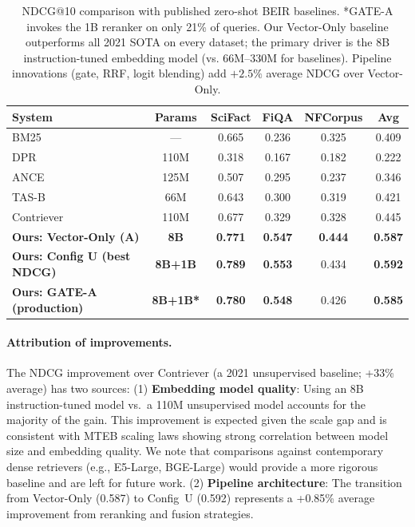 \documentclass[11pt]{article}
\begin{document}
\begin{table}[H]
\centering
\small
\begin{tabular}{lccccc}
\toprule
\textbf{System} & \textbf{Params} & \textbf{SciFact} & \textbf{FiQA} & \textbf{NFCorpus} & \textbf{Avg} \\
\midrule
BM25 \citep{thakur2021beir} & --- & 0.665 & 0.236 & 0.325 & 0.409 \\
DPR \citep{karpukhin2020dpr} & 110M & 0.318 & 0.167 & 0.182 & 0.222 \\
ANCE \citep{xiong2021ance} & 125M & 0.507 & 0.295 & 0.237 & 0.346 \\
TAS-B \citep{hofstatter2021tasb} & 66M & 0.643 & 0.300 & 0.319 & 0.421 \\
Contriever \citep{izacard2021contriever} & 110M & 0.677 & 0.329 & 0.328 & 0.445 \\
\midrule
\textbf{Ours: Vector-Only (A)} & \textbf{8B} & \textbf{0.771} & \textbf{0.547} & \textbf{0.444} & \textbf{0.587} \\
\textbf{Ours: Config U (best NDCG)} & \textbf{8B+1B} & \textbf{0.789} & \textbf{0.553} & 0.434 & \textbf{0.592} \\
\textbf{Ours: GATE-A (production)} & \textbf{8B+1B*} & \textbf{0.780} & \textbf{0.548} & 0.426 & \textbf{0.585} \\
\bottomrule
\end{tabular}
\caption{NDCG@10 comparison with published zero-shot BEIR baselines. *GATE-A invokes
the 1B reranker on only 21\% of queries. Our Vector-Only baseline outperforms all 2021
SOTA on every dataset; the primary driver is the 8B instruction-tuned embedding model
(vs. 66M--330M for baselines). Pipeline innovations (gate, RRF, logit blending) add
$+2.5\%$ average NDCG over Vector-Only.}
\label{tab:sota}
\end{table}

\paragraph{Attribution of improvements.}
The NDCG improvement over Contriever (a 2021 unsupervised baseline; +33\% average) has two sources:
(1) \textbf{Embedding model quality}: Using an 8B instruction-tuned model vs.\ a 110M
unsupervised model accounts for the majority of the gain. This improvement is expected given
the scale gap and is consistent with
MTEB \citep{muennighoff2023mteb} scaling laws showing strong correlation between model
size and embedding quality. We note that comparisons against contemporary dense retrievers
(e.g., E5-Large, BGE-Large) would provide a more rigorous baseline and are left for future work.
(2) \textbf{Pipeline architecture}: The transition from Vector-Only (0.587) to Config~U
(0.592) represents a +0.85\% average improvement from reranking and fusion strategies.
\end{document}
